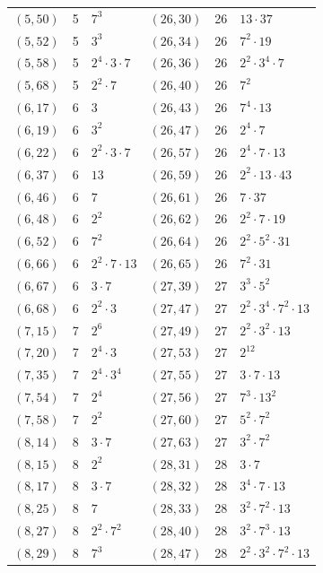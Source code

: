 \documentclass[11pt]{article}
\begin{document}
\begin{longtable}{@{}lrl@{\qquad}lrl@{}}
$(5,50)$ & 5 & $7^{3}$ & $(26,30)$ & 26 & $13\cdot 37$\\
$(5,52)$ & 5 & $3^{3}$ & $(26,34)$ & 26 & $7^{2}\cdot 19$\\
$(5,58)$ & 5 & $2^{4}\cdot 3\cdot 7$ & $(26,36)$ & 26 & $2^{2}\cdot 3^{4}\cdot 7$\\
$(5,68)$ & 5 & $2^{2}\cdot 7$ & $(26,40)$ & 26 & $7^{2}$\\
$(6,17)$ & 6 & $3$ & $(26,43)$ & 26 & $7^{4}\cdot 13$\\
$(6,19)$ & 6 & $3^{2}$ & $(26,47)$ & 26 & $2^{4}\cdot 7$\\
$(6,22)$ & 6 & $2^{2}\cdot 3\cdot 7$ & $(26,57)$ & 26 & $2^{4}\cdot 7\cdot 13$\\
$(6,37)$ & 6 & $13$ & $(26,59)$ & 26 & $2^{2}\cdot 13\cdot 43$\\
$(6,46)$ & 6 & $7$ & $(26,61)$ & 26 & $7\cdot 37$\\
$(6,48)$ & 6 & $2^{2}$ & $(26,62)$ & 26 & $2^{2}\cdot 7\cdot 19$\\
$(6,52)$ & 6 & $7^{2}$ & $(26,64)$ & 26 & $2^{2}\cdot 5^{2}\cdot 31$\\
$(6,66)$ & 6 & $2^{2}\cdot 7\cdot 13$ & $(26,65)$ & 26 & $7^{2}\cdot 31$\\
$(6,67)$ & 6 & $3\cdot 7$ & $(27,39)$ & 27 & $3^{3}\cdot 5^{2}$\\
$(6,68)$ & 6 & $2^{2}\cdot 3$ & $(27,47)$ & 27 & $2^{2}\cdot 3^{4}\cdot 7^{2}\cdot 13$\\
$(7,15)$ & 7 & $2^{6}$ & $(27,49)$ & 27 & $2^{2}\cdot 3^{2}\cdot 13$\\
$(7,20)$ & 7 & $2^{4}\cdot 3$ & $(27,53)$ & 27 & $2^{12}$\\
$(7,35)$ & 7 & $2^{4}\cdot 3^{4}$ & $(27,55)$ & 27 & $3\cdot 7\cdot 13$\\
$(7,54)$ & 7 & $2^{4}$ & $(27,56)$ & 27 & $7^{3}\cdot 13^{2}$\\
$(7,58)$ & 7 & $2^{2}$ & $(27,60)$ & 27 & $5^{2}\cdot 7^{2}$\\
$(8,14)$ & 8 & $3\cdot 7$ & $(27,63)$ & 27 & $3^{2}\cdot 7^{2}$\\
$(8,15)$ & 8 & $2^{2}$ & $(28,31)$ & 28 & $3\cdot 7$\\
$(8,17)$ & 8 & $3\cdot 7$ & $(28,32)$ & 28 & $3^{4}\cdot 7\cdot 13$\\
$(8,25)$ & 8 & $7$ & $(28,33)$ & 28 & $3^{2}\cdot 7^{2}\cdot 13$\\
$(8,27)$ & 8 & $2^{2}\cdot 7^{2}$ & $(28,40)$ & 28 & $3^{2}\cdot 7^{3}\cdot 13$\\
$(8,29)$ & 8 & $7^{3}$ & $(28,47)$ & 28 & $2^{2}\cdot 3^{2}\cdot 7^{2}\cdot 13$\\

\end{longtable}
\end{document}
